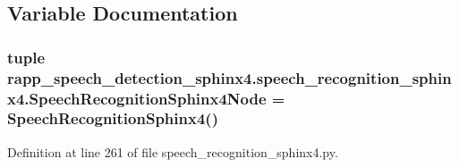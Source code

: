 \subsection{Variable Documentation}
\hypertarget{namespacerapp__speech__detection__sphinx4_1_1speech__recognition__sphinx4_a1f7be52b8e1565fce0c39407a1d72775}{
\subsubsection[{Speech\-Recognition\-Sphinx4\-Node}]{\setlength{\rightskip}{0pt plus 5cm}tuple rapp\-\_\-speech\-\_\-detection\-\_\-sphinx4.\-speech\-\_\-recognition\-\_\-sphinx4.\-Speech\-Recognition\-Sphinx4\-Node = {\bf Speech\-Recognition\-Sphinx4}()}}\label{namespacerapp__speech__detection__sphinx4_1_1speech__recognition__sphinx4_a1f7be52b8e1565fce0c39407a1d72775}


Definition at line 261 of file speech\-\_\-recognition\-\_\-sphinx4.\-py.

